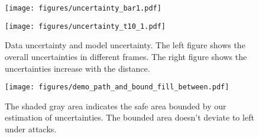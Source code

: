 \begin{figure}[htbp]
\centering
\begin{minipage}[b]{0.49\columnwidth}

\texttt{[image: figures/uncertainty\_bar1.pdf]}

\end{minipage}
\begin{minipage}[b]{0.49\columnwidth}
\centering
\texttt{[image: figures/uncertainty\_t10\_1.pdf]}

\end{minipage}
\caption{Data uncertainty and model uncertainty. The left figure shows the overall uncertainties in different frames. The right figure shows the uncertainties increase with the distance. %
}
\label{fig:uncertainty estimation}
\end{figure}


\begin{figure}[!ht]
    \centering
    \texttt{[image: figures/demo\_path\_and\_bound\_fill\_between.pdf]}
    \caption{The shaded gray area indicates the safe area bounded by our estimation of uncertainties. The bounded area doesn't deviate to left under attacks.  %
    }
    \label{fig:demo_bound_predict_desire}
\end{figure}


